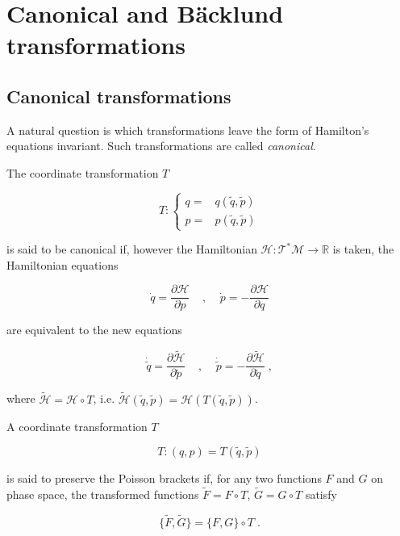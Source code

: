 \section{Canonical and Bäcklund transformations}
\subsection{Canonical transformations}
A natural question is which transformations leave the form of Hamilton's equations invariant. Such transformations are called \textit{canonical}.

\begin{defi}
The coordinate transformation $T$

\begin{equation}
    T: \left \{ \begin{array}{cc}
    q = & q(\tilde q, \tilde p) \\
    p = & p(\tilde q, \tilde p)
\end{array}
\right.
\end{equation}

is said to be canonical if, however the Hamiltonian $\mathcal{H}: \mathcal{T}^\ast \mathcal{M} \to \mathbb{R}$ is taken, the Hamiltonian equations

\begin{equation}
\dot q = \frac{\partial \mathcal{H}}{\partial p}\;\;\;\;, \;\;\;\;
\dot p = - \frac{\partial \mathcal{H}}{\partial q}
\end{equation}

are equivalent to the new equations

\begin{equation}
\dot{\tilde q} = \frac{\partial \tilde{\mathcal{H}}}{\partial \tilde p}\;\;\;\;, \;\;\;\;\dot{\tilde p} = - \frac{\partial \tilde{\mathcal{H}}}{\partial \tilde q}\;,
\end{equation}

where $\tilde{\mathcal{H}} = \mathcal{H} \circ T$, i.e. $\tilde{\mathcal{H}}(\tilde q, \tilde p) = \mathcal{H}(T(\tilde q,\tilde p))$.
\end{defi}

\begin{defi}
A coordinate transformation $T$ 

\begin{equation}
    T: (q,p) = T(\tilde q, \tilde p)
\end{equation}

is said to preserve the Poisson brackets if, for any two functions $F$ and $G$ on phase space, the transformed functions $\tilde F = F \circ T$, $\tilde G = G \circ T$ satisfy

\begin{equation}
    \{\tilde F, \tilde G\} = \{F, G\} \circ T\;.
\end{equation}
\end{defi}

